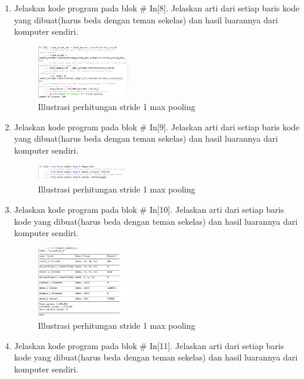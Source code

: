 \begin{enumerate}
\begin{figure}[H]
\end{figure}
\item Jelaskan kode program pada blok \# In[8]. Jelaskan arti dari setiap baris kode yang dibuat(harus beda dengan teman sekelas) dan hasil luarannya dari komputer sendiri.

\begin{figure}[H]
    \includegraphics[width=4cm]{figures/1174003/7/praktek_8.png}
    \centering
    \caption{Illustrasi perhitungan stride 1 max pooling}
\end{figure}
\item Jelaskan kode program pada blok \# In[9]. Jelaskan arti dari setiap baris kode yang dibuat(harus beda dengan teman sekelas) dan hasil luarannya dari komputer sendiri.

\begin{figure}[H]
    \includegraphics[width=4cm]{figures/1174003/7/praktek_9.png}
    \centering
    \caption{Illustrasi perhitungan stride 1 max pooling}
\end{figure}
\item Jelaskan kode program pada blok \# In[10]. Jelaskan arti dari setiap baris kode yang dibuat(harus beda dengan teman sekelas) dan hasil luarannya dari komputer sendiri.

\begin{figure}[H]
    \includegraphics[width=4cm]{figures/1174003/7/praktek_10.png}
    \centering
    \caption{Illustrasi perhitungan stride 1 max pooling}
\end{figure}
\item Jelaskan kode program pada blok \# In[11]. Jelaskan arti dari setiap baris kode yang dibuat(harus beda dengan teman sekelas) dan hasil luarannya dari komputer sendiri.

\end{enumerate}
